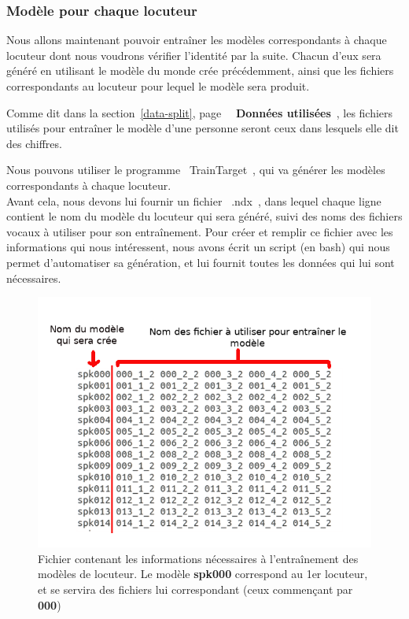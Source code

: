 \documentclass[a4paper, 12pt]{book}
\newcounter{program}[subsection]
\begin{document}
\subsubsection{Modèle pour chaque locuteur}

Nous allons maintenant pouvoir entraîner les modèles correspondants à chaque locuteur dont nous voudrons vérifier l'identité par la suite.
Chacun d'eux sera généré en utilisant le modèle du monde crée précédemment, ainsi que les fichiers correspondants au locuteur pour lequel le modèle sera produit.

Comme dit dans la section~\ref{data-split}, page~\pageref{data-split} \guillemotleft{}~\textbf{Données utilisées}~\guillemotright{}, les fichiers utilisés pour entraîner le modèle d'une personne seront ceux dans lesquels elle dit des chiffres.

Nous pouvons utiliser le programme \guillemotleft{}~TrainTarget~\guillemotright{}, qui va générer les modèles correspondants à chaque locuteur.\\
Avant cela, nous devons lui fournir un fichier \guillemotleft{}~.ndx~\guillemotright{}, dans lequel chaque ligne contient le nom du modèle du locuteur qui sera généré, suivi des noms des fichiers vocaux à utiliser pour son entraînement. Pour créer et remplir ce fichier avec les informations qui nous intéressent, nous avons écrit un script (en bash) qui nous permet d'automatiser sa génération, et lui fournit toutes les données qui lui sont nécessaires.

\begin{figure}[htbp]
  \centering
  \includegraphics[width=1\linewidth]{images/trainFile.png}
  \caption{Fichier contenant les informations nécessaires à l'entraînement des modèles de locuteur. Le modèle \textbf{spk000} correspond au 1er locuteur, et se servira des fichiers lui correspondant (ceux commençant par \textbf{000})}
\end{figure}
\end{document}
